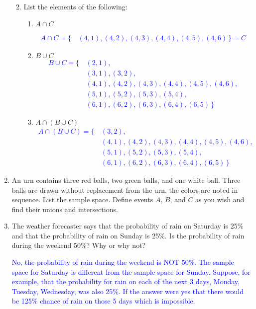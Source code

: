 \documentclass[10pt,a4paper]{report}
\newcommand{\BLUE}[1]{\textcolor{blue}{#1}}
\begin{document}
\begin{enumerate}
\begin{enumerate}[label=\alph*.]
\begin{enumerate}
	\end{enumerate}
	\item List the elements of the following:
	\begin{enumerate}
	\item $A \cap C$
	
\BLUE{\begin{align*}
	A \cap C =  \{\, &(4,1),(4,2),(4,3),(4,4),(4,5),(4,6) 	\, \} = C
\end{align*}
}
	\item $B \cup C$
\BLUE{\begin{align*}
	B\cup C = \{\,&(2,1),\\
			&(3,1),(3,2),\\
			&(4,1),(4,2),(4,3),(4,4),(4,5),(4,6),  \\
			&(5,1),(5,2),(5,3),(5,4),\\
			&(6,1),(6,2),(6,3),(6,4),(6,5)\,
		\}
\end{align*} }
	\item $A \cap(B\cup C)$
\BLUE{\begin{align*}
	A\cap(B\cup C) = \{\,&(3,2),\\
			&(4,1),(4,2),(4,3),(4,4),(4,5),(4,6),  \\
			&(5,1),(5,2),(5,3),(5,4),\\
			&(6,1),(6,2),(6,3),(6,4),(6,5)\,
		\}
\end{align*}
}
	\end{enumerate}
	
	\end{enumerate}
	\item An urn contains three red balls, two green balls, and one white ball.  Three balls are drawn without replacement from the urn, the colors are noted in sequence.  List the sample space.  Define events $A$, $B$, and $C$ as you wish and find their unions and intersections.
	
\BLUE{
}
	\setcounter{enumi}{8}
	\item The weather forecaster says that the probability of rain on Saturday is 25\% and that the probability of rain on Sunday is 25\%.  Is the probability of rain during the weekend 50\%?  Why or why not?

\BLUE{	
	No, the probability of rain during the weekend is NOT 50\%. The sample space for Saturday is different from the sample space for Sunday.  Suppose, for example, that the probability for rain on each of the next 3 days, Monday, Tuesday, Wednesday, was also 25\%.  If the answer were yes that there would be 125\% chance of rain on those 5 days which is impossible. }
	

\end{enumerate}
\end{document}

